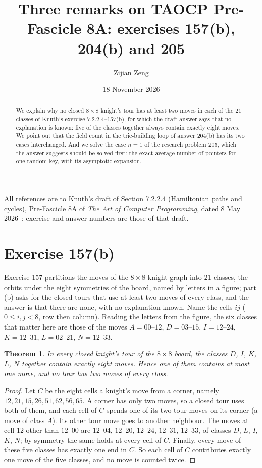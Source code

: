 \documentclass[11pt]{amsart}
\newtheorem{theorem}{Theorem}
\theoremstyle{remark}
\begin{document}
\title[Three remarks on Pre-Fascicle 8A]{Three remarks on TAOCP Pre-Fascicle 8A: exercises 157(b), 204(b) and 205}
\author{Zijian Zeng}
\address{UCSI University, Kuala Lumpur, Malaysia}
\date{18 November 2026}
\begin{abstract}
We explain why no closed $8\times8$ knight's tour has at least two moves in each of the $21$ classes of Knuth's
exercise 7.2.2.4--157(b), for which the draft answer says that no explanation is known: five of the classes
together always contain exactly eight moves. We point out that the field count in the trie-building loop of
answer 204(b) has its two cases interchanged. And we solve the case $n=1$ of the research problem 205, which the
answer suggests should be solved first: the exact average number of pointers for one random key, with its
asymptotic expansion.
\end{abstract}
\maketitle

All references are to Knuth's draft of Section 7.2.2.4 (Hamiltonian paths and cycles), Pre-Fascicle 8A of
\emph{The Art of Computer Programming}, dated 8 May 2026~\cite{knuth8a}; exercise and answer numbers are those of
that draft.

\section{Exercise 157(b)}
Exercise 157 partitions the moves of the $8\times8$ knight graph into $21$ classes, the orbits under the eight
symmetries of the board, named by letters in a figure; part (b) asks for the closed tours that use at least two
moves of every class, and the answer is that there are none, with no explanation known. Name the cells $ij$
($0\le i,j<8$, row then column). Reading the letters from the figure, the six classes that matter here are those
of the moves $A=00\text{--}12$, $D=03\text{--}15$, $I=12\text{--}24$, $K=12\text{--}31$, $L=02\text{--}21$,
$N=12\text{--}33$.

\begin{theorem}
In every closed knight's tour of the $8\times8$ board, the classes $D$, $I$, $K$, $L$, $N$ together contain exactly
eight moves. Hence one of them contains at most one move, and no tour has two moves of every class.
\end{theorem}
\begin{proof}
Let $C$ be the eight cells a knight's move from a corner, namely $12,21,15,26,51,62,56,65$. A corner has only two
moves, so a closed tour uses both of them, and each cell of $C$ spends one of its two tour moves on its corner (a
move of class $A$). Its other tour move goes to another neighbour. The moves at cell $12$ other than $12\text{--}00$
are $12\text{--}04$, $12\text{--}20$, $12\text{--}24$, $12\text{--}31$, $12\text{--}33$, of classes $D$, $L$, $I$, $K$,
$N$; by symmetry the same holds at every cell of $C$. Finally, every move of these five classes has exactly one end
in $C$. So each cell of $C$ contributes exactly one move of the five classes, and no move is counted twice.
\end{proof}
\end{document}
